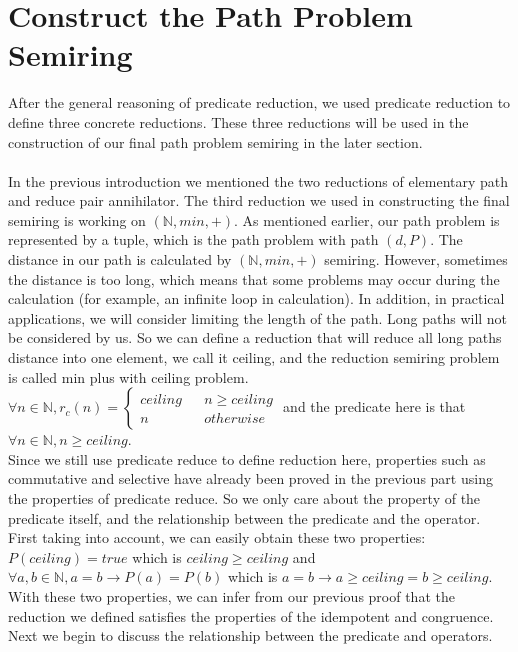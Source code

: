 \documentclass[a4paper,10pt]{article}
\begin{document}
\section{Construct the Path Problem Semiring}
After the general reasoning of predicate reduction, we used predicate reduction to define three concrete reductions. These three reductions will be used in the construction of our final path problem semiring in the later section. \\\\
In the previous introduction we mentioned the two reductions of elementary path and reduce pair annihilator. The third reduction we used in constructing the final semiring is working on $(\mathbb{N},min,+)$. As mentioned earlier, our path problem is represented by a tuple, which is the path problem with path $(d,P)$. The distance in our path is calculated by $(\mathbb{N},min,+)$ semiring. However, sometimes the distance is too long, which means that some problems may occur during the calculation (for example, an infinite loop in calculation). In addition, in practical applications, we will consider limiting the length of the path. Long paths will not be considered by us. So we can define a reduction that will reduce all long paths distance into one element, we call it ceiling, and the reduction semiring problem is called min plus with ceiling problem. $\forall n \in \mathbb{N}, r_c(n) = \left\{
\begin{aligned}
ceiling &  & n \geq ceiling \\
n &  & otherwise 
\end{aligned}
\right.$ and the predicate here is that $\forall n \in \mathbb{N}, n \geq ceiling$.\\
Since we still use predicate reduce to define reduction here, properties such as commutative and selective have already been proved in the previous part using the properties of predicate reduce. 
So we only care about the property of the predicate itself, and the relationship between the predicate and the operator.\\
First taking into account, we can easily obtain these two properties: $P(ceiling) = true$ which is $ceiling \geq ceiling$ and $\forall a,b \in \mathbb{N}, a = b \rightarrow P(a) = P(b)$ which is $a = b \rightarrow a \geq ceiling = b \geq ceiling$. With these two properties, we can infer from our previous proof that the reduction we defined satisfies the properties of the idempotent and congruence.\\
Next we begin to discuss the relationship between the predicate and operators. \\
\end{document}
